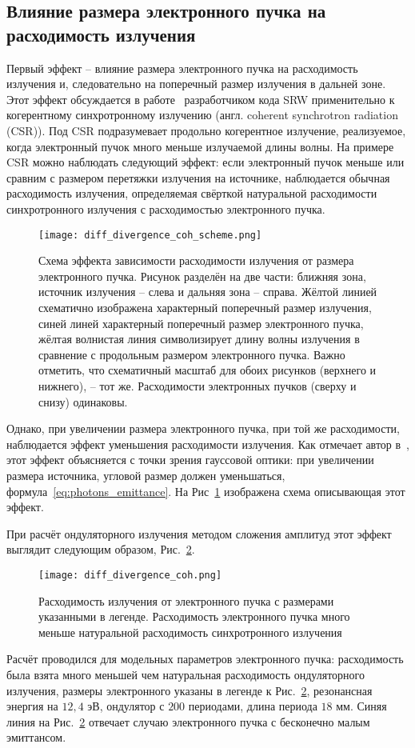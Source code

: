 \subsection{Влияние размера электронного пучка на расходимость излучения}
Первый эффект -- влияние размера электронного пучка на расходимость излучения и, следовательно на поперечный размер излучения в дальней зоне. Этот эффект обсуждается в работе~\cite{chubar_simulation_2006} разработчиком кода SRW применительно к когерентному синхротронному излучению (англ. coherent synchrotron radiation (CSR)). Под CSR подразумевает продольно когерентное излучение, реализуемое, когда электронный пучок много меньше излучаемой длины волны. На примере CSR можно наблюдать следующий эффект: если электронный пучок меньше или сравним с размером перетяжки излучения на источнике, наблюдается обычная расходимость излучения, определяемая свёрткой натуральной расходимости синхротронного излучения с расходимостью электронного пучка.
\begin{figure}[H]
	\centering 	\texttt{[image: diff\_divergence\_coh\_scheme.png]}
	\caption{Схема эффекта зависимости расходимости излучения от размера электронного пучка. Рисунок разделён на две части: ближняя зона, источник излучения -- слева и дальняя зона -- справа. Жёлтой линией схематично изображена характерный поперечный размер излучения, синей линей характерный поперечный размер электронного пучка, жёлтая волнистая линия символизирует длину волны излучения в сравнение с продольным размером электронного пучка. Важно отметить, что схематичный масштаб для обоих рисунков (верхнего и нижнего), -- тот же. Расходимости электронных пучков (сверху и снизу) одинаковы.}
	\label{fig:diff_divergence_coh_scheme}
\end{figure}
Однако, при увеличении размера электронного пучка, при той же расходимости, наблюдается эффект уменьшения расходимости излучения. Как отмечает автор в~\cite{chubar_simulation_2006}, этот эффект объясняется с точки зрения гауссовой оптики: при увеличении размера источника, угловой размер должен уменьшаться, формула~\ref{eq:photons_emittance}. На Рис~\ref{fig:diff_divergence_coh_scheme} изображена схема описывающая этот эффект.

При расчёт ондуляторного излучения методом сложения амплитуд этот эффект выглядит следующим образом, Рис.~\ref{fig:diff_coh_incoh_rad}.
\begin{figure}[H] 
	\centering 	\texttt{[image: diff\_divergence\_coh.png]}
	\caption{Расходимость излучения от электронного пучка с размерами указанными в легенде. Расходимость электронного пучка много меньше натуральной расходимость синхротронного излучения}
	\label{fig:diff_coh_incoh_rad}
\end{figure}
Расчёт проводился для модельных параметров электронного пучка: расходимость была взята много меньшей чем натуральная расходимость ондуляторного излучения, размеры электронного указаны в легенде к Рис.~\ref{fig:diff_coh_incoh_rad}, резонансная энергия на $12,4$ эВ, ондулятор с $200$ периодами, длина периода $18$ мм. Синяя линия на Рис.~\ref{fig:diff_coh_incoh_rad} отвечает случаю электронного пучка с бесконечно малым эмиттансом.

